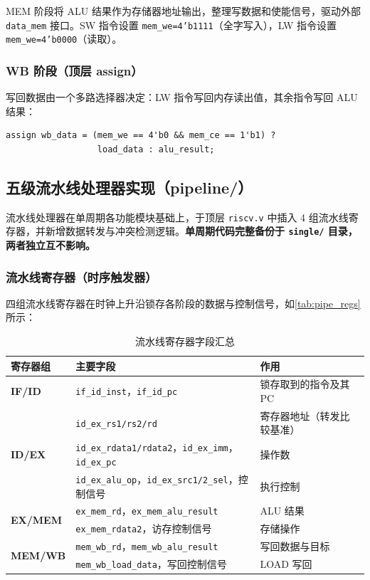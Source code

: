 \documentclass[12pt,hyperref,a4paper,UTF8]{ctexart}
\begin{document}
MEM 阶段将 ALU 结果作为存储器地址输出，整理写数据和使能信号，驱动外部 \texttt{data\_mem} 接口。SW 指令设置 \texttt{mem\_we=4'b1111}（全字写入），LW 指令设置 \texttt{mem\_we=4'b0000}（读取）。

\subsubsection{WB 阶段（顶层 assign）}

写回数据由一个多路选择器决定：LW 指令写回内存读出值，其余指令写回 ALU 结果：

\begin{lstlisting}[caption={WB 回写数据选择}]
assign wb_data = (mem_we == 4'b0 && mem_ce == 1'b1) ?
                  load_data : alu_result;
\end{lstlisting}

\subsection{五级流水线处理器实现（pipeline/）}

流水线处理器在单周期各功能模块基础上，于顶层 \texttt{riscv.v} 中插入 4 组流水线寄存器，并新增数据转发与冲突检测逻辑。\textbf{单周期代码完整备份于 \texttt{single/} 目录，两者独立互不影响。}

\subsubsection{流水线寄存器（时序触发器）}

四组流水线寄存器在时钟上升沿锁存各阶段的数据与控制信号，如\autoref{tab:pipe_regs}所示：

\begin{table}[H]
    \centering
    \caption{流水线寄存器字段汇总}
    \label{tab:pipe_regs}
    \begin{tabular}{lll}
        \toprule
        寄存器组 & 主要字段 & 作用 \\
        \midrule
        \textbf{IF/ID} & \texttt{if\_id\_inst}，\texttt{if\_id\_pc} & 锁存取到的指令及其 PC \\
        \midrule
        \multirow{3}{*}{\textbf{ID/EX}} & \texttt{id\_ex\_rs1/rs2/rd} & 寄存器地址（转发比较基准） \\
         & \texttt{id\_ex\_rdata1/rdata2}，\texttt{id\_ex\_imm}，\texttt{id\_ex\_pc} & 操作数 \\
         & \texttt{id\_ex\_alu\_op}，\texttt{id\_ex\_src1/2\_sel}，控制信号 & 执行控制 \\
        \midrule
        \multirow{2}{*}{\textbf{EX/MEM}} & \texttt{ex\_mem\_rd}，\texttt{ex\_mem\_alu\_result} & ALU 结果 \\
         & \texttt{ex\_mem\_rdata2}，访存控制信号 & 存储操作 \\
        \midrule
        \multirow{2}{*}{\textbf{MEM/WB}} & \texttt{mem\_wb\_rd}，\texttt{mem\_wb\_alu\_result} & 写回数据与目标 \\
         & \texttt{mem\_wb\_load\_data}，写回控制信号 & LOAD 写回 \\
        \bottomrule
    \end{tabular}
\end{table}
\end{document}
